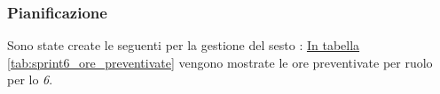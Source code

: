 \subsubsection{Pianificazione}
\label{sec:sprint6_pianificazione}
Sono state create le seguenti  per la gestione del sesto : 
\hyperref[tab:sprint6_ore_preventivate]{In tabella \ref{tab:sprint6_ore_preventivate}} vengono mostrate le ore preventivate per ruolo per lo \textit{ 6}.

\begin{table}[H]
    \centering
    \caption{Ore preventivate per ruolo  6}
    \label{tab:sprint6_ore_preventivate}
\end{table}